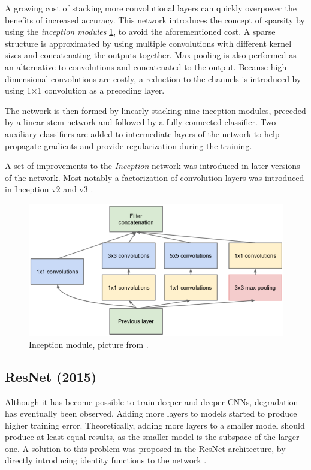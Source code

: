 A growing cost of stacking more convolutional layers can quickly overpower the benefits of increased accuracy. This network introduces the concept of sparsity by using the \textit{inception modules} \cref{fig:incept_mod}, to avoid the aforementioned cost. A sparse structure is approximated by using multiple convolutions with different kernel sizes and concatenating the outputs together. Max-pooling is also performed as an alternative to convolutions and concatenated to the output. Because high dimensional convolutions are costly, a reduction to the channels is introduced by using 1$\times$1 convolution as a preceding layer.

The network is then formed by linearly stacking nine inception modules, preceded by a linear stem network and followed by a fully connected classifier. Two auxiliary classifiers are added to intermediate layers of the network to help propagate gradients and provide regularization during the training.

A set of improvements to the \textit{Inception} network was introduced in later versions of the network. Most notably a factorization of convolution layers was introduced in Inception v2 and v3 \cite{bib:inception2}.


\begin{figure}
    \includegraphics[width=\textwidth]{img/inception}
    \caption{Inception module, picture from \cite[figure 2]{bib:googlenet}.}
    \label{fig:incept_mod}
\end{figure}

\subsection{ResNet (2015)}
\label{sec:resnet}

Although it has become possible to train deeper and deeper CNNs, degradation has eventually been observed. Adding more layers to models started to produce higher training error. Theoretically, adding more layers to a smaller model should produce at least equal results, as the smaller model is the subspace of the larger one. A solution to this problem was proposed in the ResNet architecture, by directly introducing identity functions to the network \cite{bib:resnet}.  

